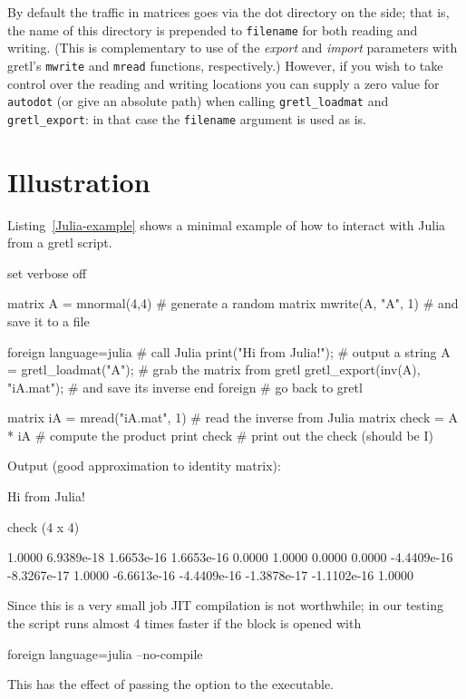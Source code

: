 By default the traffic in matrices goes via the dot directory on the
 side; that is, the name of this directory is prepended to
\texttt{filename} for both reading and writing. (This is complementary
to use of the \textsl{export} and \textsl{import} parameters with
gretl's \texttt{mwrite} and \texttt{mread} functions, respectively.)
However, if you wish to take control over the reading and writing
locations you can supply a zero value for \texttt{autodot} (or give an
absolute path) when calling \verb|gretl_loadmat| and
\verb|gretl_export|: in that case the \texttt{filename} argument is
used as is.

\section{Illustration}

Listing~\ref{Julia-example} shows a minimal example of how to interact
with Julia from a gretl script.

\begin{script}[htbp]
  \label{Julia-example}
\begin{scode}
set verbose off

matrix A = mnormal(4,4)                # generate a random matrix
mwrite(A, "A", 1)                      # and save it to a file

foreign language=julia                 # call Julia
    print("Hi from Julia!\n");         # output a string
    A = gretl_loadmat("A");            # grab the matrix from gretl
    gretl_export(inv(A), "iA.mat");    # and save its inverse
end foreign                            # go back to gretl

matrix iA = mread("iA.mat", 1)         # read the inverse from Julia
matrix check = A * iA                  # compute the product
print check                            # print out the check (should be I)
\end{scode}
Output (good approximation to identity matrix):
\begin{code}
Hi from Julia!

check (4 x 4)

      1.0000   6.9389e-18   1.6653e-16   1.6653e-16 
      0.0000       1.0000       0.0000       0.0000 
 -4.4409e-16  -8.3267e-17       1.0000  -6.6613e-16 
 -4.4409e-16  -1.3878e-17  -1.1102e-16       1.0000 
\end{code}
\end{script}

Since this is a very small job JIT compilation is not worthwhile; in
our testing the script runs almost 4 times faster if the 
block is opened with
\begin{code}
foreign language=julia --no-compile
\end{code}
This has the effect of passing the option  to the
 executable.


